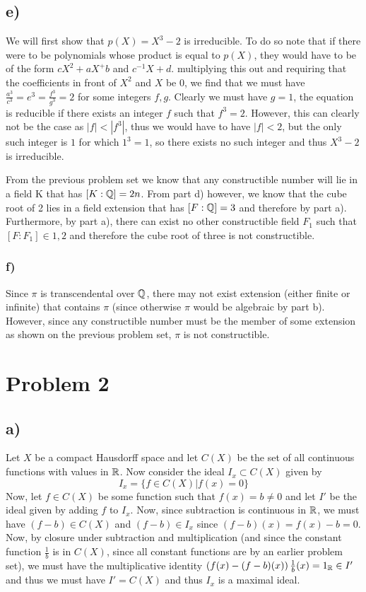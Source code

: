 \subsection*{e)}
We will first show that $p(X)=X^3-2$ is irreducible. To do so note that if there were to be polynomials whose product is equal to $p(X)$, they would have to be of the form $cX^2+aX^+b$ and $c^{-1}X+d$. multiplying this out and requiring that the coefficients in front of $X^2$ and $X$ be $0$, we find that we must have $\frac{a^3}{c^3}=e^3=\frac{f^3}{g^3}=2$ for some integers $f,g$. Clearly we must have $g=1$, the equation is reducible if there exists an integer $f$ such that $f^3=2$. However, this can clearly not be the case as $|f|<|f^3|$, thus we would have to have $|f|<2$, but the only such integer is $1$ for which $1^3=1$, so there exists no such integer and thus $X^3-2$ is irreducible. \par
From the previous problem set we know that any constructible number will lie in a field K that has $[K:\mathbb{Q}]=2n$. From part d) however, we know that the cube root of 2 lies in a field extension that has $[F:\mathbb{Q}]=3$ and therefore by part a). Furthermore, by part  a), there can exist no other constructible field $F_1$ such that $[F:F_1]\in {1,2}$ and therefore the cube root of three is not constructible. 
\subsubsection*{f)}
Since $\pi$ is transcendental over $\mathbb{Q}$, there may not exist extension (either finite or infinite) that contains $\pi$ (since otherwise $\pi$ would be algebraic by part b). However, since any constructible number must be the member of some extension as shown on the previous problem set, $\pi$ is not constructible. 
\section*{Problem 2}
\subsection*{a)}
Let $X$ be a compact Hausdorff space and let $C(X)$ be the set of all continuous functions with values in $\mathbb{R}$. Now consider the ideal $I_x\subset C(X)$ given by
\[ I_x = \{ f\in C(X) | f(x) = 0 \} \]
Now, let $f\in C(X)$ be some function such that $f(x)=b\neq 0$ and let $I'$ be the ideal given by adding $f$ to $I_x$. Now, since subtraction is continuous in $\mathbb{R}$, we must have $(f-b)\in C(X)$ and $(f-b)\in I_x$ since $(f-b)(x) = f(x)-b = 0$. Now, by closure under subtraction and multiplication (and since the constant function $\frac{1}{b}$ is in $C(X)$, since all constant functions are by an earlier problem set), we must have the multiplicative identity $\left(f(x)-(f-b)(x)\right)\frac{1}{b}(x)=1_{\mathbb{R}} \in I'$ and thus we must have $I' = C(X)$ and thus $I_x$ is a maximal ideal.
